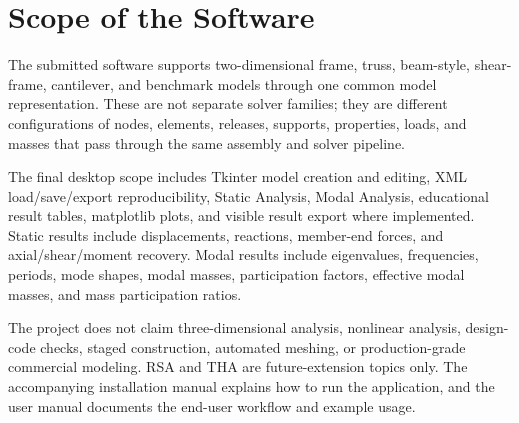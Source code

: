 \section{Scope of the Software}

The submitted software supports two-dimensional frame, truss, beam-style, shear-frame, cantilever, and benchmark models through one common model representation. These are not separate solver families; they are different configurations of nodes, elements, releases, supports, properties, loads, and masses that pass through the same assembly and solver pipeline.

The final desktop scope includes Tkinter model creation and editing, XML load/save/export reproducibility, Static Analysis, Modal Analysis, educational result tables, matplotlib plots, and visible result export where implemented. Static results include displacements, reactions, member-end forces, and axial/shear/moment recovery. Modal results include eigenvalues, frequencies, periods, mode shapes, modal masses, participation factors, effective modal masses, and mass participation ratios.

The project does not claim three-dimensional analysis, nonlinear analysis, design-code checks, staged construction, automated meshing, or production-grade commercial modeling. RSA and THA are future-extension topics only. The accompanying installation manual explains how to run the application, and the user manual documents the end-user workflow and example usage.
